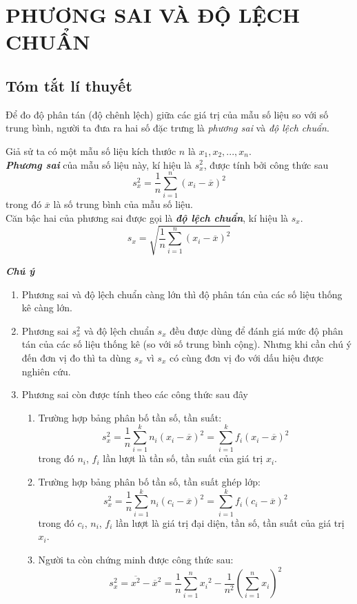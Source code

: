 \section{PHƯƠNG SAI VÀ ĐỘ LỆCH CHUẨN}
\subsection{Tóm tắt lí thuyết}
Để đo độ phân tán (độ chênh lệch) giữa các giá trị của mẫu số liệu so với số trung bình, người ta đưa ra hai số đặc trưng là \textit{phương sai} và \textit{độ lệch chuẩn}.

\begin{dn}
Giả sử ta có một mẫu số liệu kích thước $n$ là ${x_1, x_2, ..., x_n}$.\\
\textbf{\textit{Phương sai}} của mẫu số liệu này, kí hiệu là $s_x^2$, được tính bởi công thức sau
$$s_x^2=\dfrac{1}{n}\sum\limits_{i=1}^n{\left( {x_i}-\overline{x} \right)}^2$$
trong đó $\overline{x}$ là số trung bình của mẫu số liệu.\\
Căn bậc hai của phương sai được gọi là \textbf{\textit{độ lệch chuẩn}}, kí hiệu là $s_x$.
$$s_x=\sqrt{\dfrac{1}{n}\sum\limits_{i=1}^n{\left( {x_i}-\overline{x} \right)}^2}$$
\end{dn}

\begin{note}
\textbf{\textit{Chú ý}}
\begin{enumerate}
	\item Phương sai và độ lệch chuẩn càng lớn thì độ phân tán của các số liệu thống kê càng lớn.
	\item Phương sai $s_x^2$ và độ lệch chuẩn $s_x$ đều được dùng để đánh giá mức độ phân tán của các số liệu thống kê (so với số trung bình cộng). Nhưng khi cần chú ý đến đơn vị đo thì ta dùng $s_x$ vì $s_x$ có cùng đơn vị đo với dấu hiệu được nghiên cứu.
	\item Phương sai còn được tính theo các công thức sau đây
	\begin{enumerate}
		\item Trường hợp bảng phân bố tần số, tần suất:
		$$s_x^2=\dfrac{1}{n}\sum\limits_{i=1}^k n_i {\left( {x_i}-\overline{x} \right)}^2 
		=\sum\limits_{i=1}^k f_i {\left( {x_i}-\overline{x} \right)}^2$$
		trong đó $n_i$, $f_i$ lần lượt là tần số, tần suất của giá trị $x_i$.
		\item Trường hợp bảng phân bố tần số, tần suất ghép lớp:		
		$$s_x^2=\dfrac{1}{n}\sum\limits_{i=1}^k n_i {\left( {c_i}-\overline{x} \right)}^2 
		=\sum\limits_{i=1}^k f_i {\left( {c_i}-\overline{x} \right)}^2$$
		trong đó $c_i$, $n_i$, $f_i$ lần lượt là giá trị đại diện, tần số, tần suất của giá trị $x_i$.
		\item Người ta còn chứng minh được công thức sau:
		$$s_x^2 = \overline{x^2} - \overline{x}^2 = \dfrac{1}{n}  \sum\limits_{i=1}^n {x_i}^2 - \dfrac{1}{n^2} {\left( \sum\limits_{i=1}^n {x_i} \right)}^2$$
	\end{enumerate}
\end{enumerate}
\end{note}


